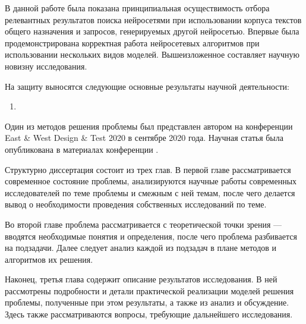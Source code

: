 В данной работе была показана принципиальная осуществимость отбора релевантных результатов поиска нейросетями при использовании
корпуса текстов общего назначения и запросов, генерируемых другой нейросетью. Впервые была продемонстрирована корректная
работа нейросетевых алгоритмов при использовании нескольких видов моделей.
Вышеизложенное составляет научную новизну исследования.

На защиту выносятся следующие основные результаты научной деятельности:
\begin{enumerate}[1)]
    \item 
\end{enumerate}

Один из методов решения проблемы был представлен автором на конференции East \& West Design \& Test 2020 в сентябре 2020 года. 
Научная статья была опубликована в материалах конференции \cite{9224840}. %

Структурно диссертация состоит из трех глав. В первой главе рассматривается современное состояние проблемы, анализируются
научные работы современных исследователей по теме проблемы и смежным с ней темам, после чего делается вывод о необходимости
проведения собственных исследований по теме. 

Во второй главе проблема рассматривается с теоретической точки зрения --- вводятся необходимые понятия и определения, после чего 
проблема разбивается на подзадачи. Далее следует анализ каждой из подзадач в плане методов и алгоритмов их решения.

Наконец, третья глава содержит описание результатов исследования. В ней рассмотрены подробности и детали практической реализации
моделей решения проблемы, полученные при этом результаты, а также из анализ и обсуждение. Здесь также рассматриваются вопросы,
требующие дальнейшего исследования.
